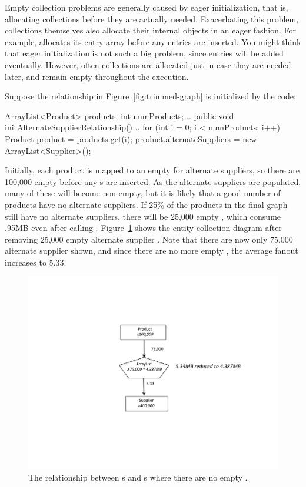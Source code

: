 Empty collection problems are generally caused by eager initialization, that is,
allocating collections before they are actually needed. Exacerbating this
problem, collections themselves also allocate their internal objects in an eager
fashion. For example,  allocates its entry array before any entries are inserted.
You might think that eager initialization is not such a big problem, since
entries will be added eventually. However, often collections are allocated
just in case they are needed later, and remain empty throughout the execution.

Suppose the relationship
in Figure~\ref{fig:trimmed-graph} is initialized by the code:
\begin{shortlisting}
ArrayList<Product> products;
int numProducts;
   ..
   public void initAlternateSupplierRelationship() {
       ..
       for (int i = 0; i < numProducts; i++) {
          Product product = products.get(i);
          product.alternateSuppliers = 
                           new ArrayList<Supplier>();
       }
   }
\end{shortlisting}
Initially, each product is mapped to an empty  for alternate
suppliers, so there are 100,000 empty  before any
s are inserted. As the alternate suppliers are populated, many
of these  will become non-empty, but it is likely that a good
number of products have no alternate suppliers. If 25\% of the products in the
final graph still have no alternate suppliers, there will be 25,000 empty
, which consume .95MB even after calling . 
Figure~\ref{fig:empty-array} shows the entity-collection
diagram after removing 25,000 empty alternate supplier . Note
that there are now only 75,000 alternate supplier  shown, and
since there are no more empty , the average fanout increases to 5.33. 
\begin{figure}
  \centering
 \includegraphics[width=.80\textwidth]{part1/Figures/collections/empty-product.pdf}
 \caption{The relationship between s and s
  where there are no empty .}
  \label{fig:empty-array}
\end{figure}
 
